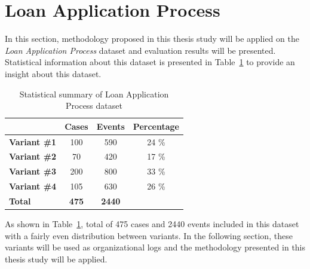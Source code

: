 \section{Loan Application Process}
\label{sec:loan-app-process}
In this section, methodology proposed in this thesis study will be applied on the \textit{Loan Application Process} dataset \cite{loan-app-data} and evaluation results will be presented. Statistical information about this dataset is presented in Table~\ref{table:loan-app-process-summary} to provide an insight about this dataset.
\begin{table}[]
\centering
\caption{Statistical summary of Loan Application Process dataset}
\label{table:loan-app-process-summary}
\begin{tabular}{@{}lccc@{}}
\toprule
                  & {\bf Cases} & {\bf Events} & {\bf Percentage} \\ \midrule
{\bf Variant \#1} & 100         & 590          & 24 \%            \\ \midrule
{\bf Variant \#2} & 70          & 420          & 17 \%            \\ \midrule
{\bf Variant \#3} & 200         & 800          & 33 \%            \\ \midrule
{\bf Variant \#4} & 105         & 630          & 26 \%            \\ \midrule
{\bf Total}       & {\bf 475}   & {\bf 2440}   & {\bf }           \\ \bottomrule
\end{tabular}
\end{table}

As shown in Table~\ref{table:loan-app-process-summary}, total of 475 cases and 2440 events included in this dataset with a fairly even distribution between variants. In the following section, these variants will be used as organizational logs and the methodology presented in this thesis study will be applied.

